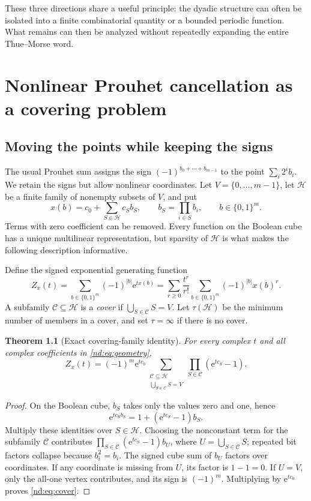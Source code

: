 \documentclass[11pt,a4paper,oneside,openany]{book}
\numberwithin{equation}{chapter}
\newtheorem{theorem}{Theorem}[chapter]
\theoremstyle{definition}
\theoremstyle{remark}
\newcommand{\e}{\mathrm e}
\newcommand{\HH}{\mathcal H}
\newcommand{\CCov}{\mathcal C}
\newcommand{\bits}{\{0,1\}}
\begin{document}
These three directions share a useful principle: the dyadic structure can often
be isolated into a finite combinatorial quantity or a bounded periodic function.
What remains can then be analyzed without repeatedly expanding the entire
Thue--Morse word.
\chapter{Nonlinear Prouhet cancellation as a covering problem}
\label{nd:sec:hypergraph}

\section{Moving the points while keeping the signs}
The usual Prouhet sum assigns the sign \((-1)^{b_0+\cdots+b_{m-1}}\) to the
point \(\sum_i2^ib_i\). We retain the signs but allow nonlinear coordinates.
Let \(V=\{0,\ldots,m-1\}\), let \(\HH\) be a finite family of nonempty subsets
of \(V\), and put
\begin{equation}
 x(b)=c_0+\sum_{S\in\HH}c_S b_S,
 \qquad b_S=\prod_{i\in S}b_i,
 \qquad b\in\bits^m.
 \label{nd:eq:geometry}
\end{equation}
Terms with zero coefficient can be removed. Every function on the Boolean cube
has a unique multilinear representation, but sparsity of \(\HH\) is what makes
the following description informative.

Define the signed exponential generating function
\begin{equation}
 Z_x(t)=\sum_{b\in\bits^m}(-1)^{|b|}\e^{t x(b)}
       =\sum_{r\ge0}\frac{t^r}{r!}
           \sum_{b\in\bits^m}(-1)^{|b|}x(b)^r.
 \label{nd:eq:Z}
\end{equation}
A subfamily \(\CCov\subseteq\HH\) is a \emph{cover} if
\(\bigcup_{S\in\CCov}S=V\). Let \(\tau(\HH)\) be the minimum number of
members in a cover, and set \(\tau=\infty\) if there is no cover.

\begin{theorem}[Exact covering-family identity]
\label{nd:thm:cover}
For every complex \(t\) and all complex coefficients in \eqref{nd:eq:geometry},
\begin{equation}
 Z_x(t)=(-1)^m\e^{tc_0}
 \sum_{\substack{\CCov\subseteq\HH\\\bigcup_{S\in\CCov}S=V}}
       \prod_{S\in\CCov}(\e^{tc_S}-1).
 \label{nd:eq:cover}
\end{equation}
\end{theorem}
\begin{proof}
On the Boolean cube, \(b_S\) takes only the values zero and one, hence
\[
 \e^{tc_Sb_S}=1+(\e^{tc_S}-1)b_S.
\]
Multiply these identities over \(S\in\HH\). Choosing the nonconstant term
for the subfamily \(\CCov\) contributes
\(\prod_{S\in\CCov}(\e^{tc_S}-1)b_U\), where
\(U=\bigcup_{S\in\CCov}S\); repeated bit factors collapse because
\(b_i^2=b_i\). The signed cube sum of \(b_U\) factors over coordinates. If
any coordinate is missing from \(U\), its factor is \(1-1=0\). If \(U=V\),
only the all-one vertex contributes, and its sign is \((-1)^m\).
Multiplying by \(\e^{tc_0}\) proves \eqref{nd:eq:cover}.
\end{proof}
\end{document}
